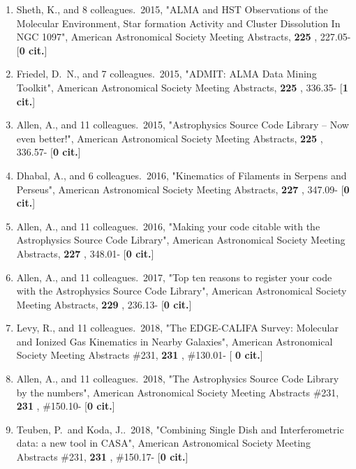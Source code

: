 \documentclass[11pt,letterpaper]{article}
\begin{document}
\begin{enumerate}[resume,label=\textbf{\arabic*}.]
\item  
Sheth, K., and 8 colleagues.\  2015,  "ALMA and HST Observations of the 
Molecular Environment, Star formation Activity and Cluster Dissolution In 
NGC 1097", American Astronomical Society Meeting Abstracts,  {\bf 225} , 
227.05- [{\bf 0 cit.}] 

\item  
Friedel, D.~N., and 7 colleagues.\  2015,  "ADMIT: ALMA Data Mining 
Toolkit", American Astronomical Society Meeting Abstracts,  {\bf 225} , 
336.35- [{\bf 1 cit.}] 

\item  
Allen, A., and 11 colleagues.\  2015,  "Astrophysics Source Code Library -- 
Now even better!", American Astronomical Society Meeting Abstracts,  {\bf 
225} , 336.57- [{\bf 0 cit.}] 
\item  
Dhabal, A., and 6 colleagues.\  2016,  "Kinematics of Filaments in Serpens 
and Perseus", American Astronomical Society Meeting Abstracts,  {\bf 227} , 
347.09- [{\bf 0 cit.}] 

\item  
Allen, A., and 11 colleagues.\  2016,  "Making your code citable with the 
Astrophysics Source Code Library", American Astronomical Society Meeting 
Abstracts,  {\bf 227} , 348.01- [{\bf 0 cit.}] 
\item  
Allen, A., and 11 colleagues.\  2017,  "Top ten reasons to register your 
code with the Astrophysics Source Code Library", American Astronomical 
Society Meeting Abstracts,  {\bf 229} , 236.13- [{\bf 0 cit.}] 
\item  
Levy, R., and 11 colleagues.\  2018,  "The EDGE-CALIFA Survey: 
Molecular and Ionized Gas Kinematics in Nearby Galaxies", American 
Astronomical Society Meeting Abstracts \#231,  {\bf 231} , \#130.01- [{\bf 
0 cit.}] 

\item  
Allen, A., and 11 colleagues.\  2018,  "The Astrophysics Source Code 
Library by the numbers", American Astronomical Society Meeting Abstracts 
\#231,  {\bf 231} , \#150.10- [{\bf 0 cit.}] 
\item  
Teuben, P.~and Koda, J..\  2018,  "Combining Single Dish and 
Interferometric data: a new tool in CASA", American Astronomical Society 
Meeting Abstracts \#231,  {\bf 231} , \#150.17- [{\bf 0 cit.}] 


\end{enumerate}
\end{document}
